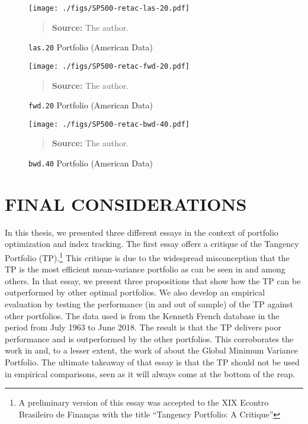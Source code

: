\documentclass[12pt,oneside,a4paper]{memoir}
\begin{document}
\begin{figure}[htpb]
\centering
\footnotesize
\caption{\texttt{las.20} Portfolio (American Data)}
\label{fig:spy:las.20}
\texttt{[image: ./figs/SP500-retac-las-20.pdf]}
\begin{quote}
\textbf{Source:} The author.
\end{quote}
\end{figure}

\begin{figure}[htpb]
\centering
\footnotesize
\caption{\texttt{fwd.20} Portfolio (American Data)}
\label{fig:spy:fwd.20}
\texttt{[image: ./figs/SP500-retac-fwd-20.pdf]}
\begin{quote}
\textbf{Source:} The author.
\end{quote}
\end{figure}

\begin{figure}[htpb]
\centering
\footnotesize
\caption{\texttt{bwd.40} Portfolio (American Data)}
\label{fig:spy:bwd.40}
\texttt{[image: ./figs/SP500-retac-bwd-40.pdf]}
\begin{quote}
\textbf{Source:} The author.
\end{quote}
\end{figure}

\chapter{FINAL CONSIDERATIONS}

In this thesis, we presented three different essays in the context of portfolio optimization and index tracking.
The first essay offers a critique of the Tangency Portfolio (TP).\footnote{A preliminary version of this essay was accepted to the XIX Econtro Brasileiro de Finanças with the title ``Tangency Portfolio: A Critique''}
This critique is due to the widespread misconception that the TP is the most efficient mean-variance portfolio as can be seen in  and  among others.
In that essay, we present three propositions that show how the TP can be outperformed by other optimal portfolios.
We also develop an empirical evaluation by testing the performance (in and out of sample) of the TP against other portfolios.
The data used is from the Kenneth French database in the period from July 1963 to June 2018.
The result is that the TP delivers poor performance and is outperformed by the other portfolios.
This corroborates the work in  and, to a lesser extent, the work of  about the Global Minimum Variance Portfolio.
The ultimate takeaway of that essay is that the TP should not be used in empirical comparisons, seen as it will always come at the bottom of the reap.
\end{document}
